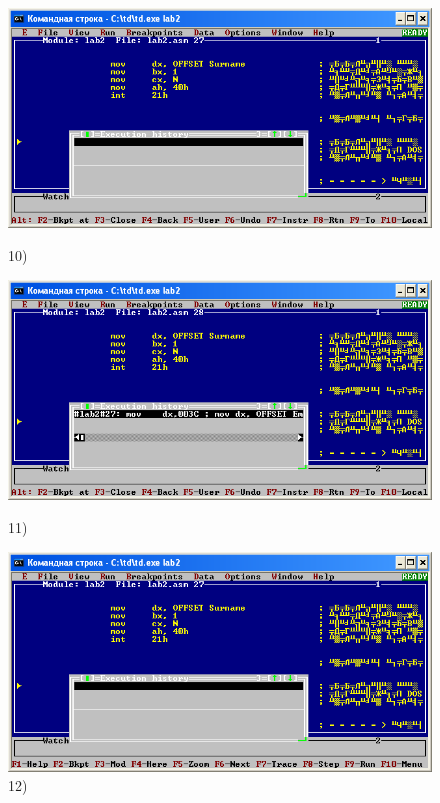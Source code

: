 \begin{figure}[!htp]
    \centering
    \begin{minipage}{0.32\textwidth}
        \centering
        \includegraphics[width=.99\linewidth]
            {../_INCLUDES/task-4-17-1/10.png}
        \caption{10) }
        \label{fig:task_4_17_2__10}
    \end{minipage}
    \begin {minipage}{0.32\textwidth}
        \centering
        \includegraphics[width=.99\linewidth]
            {../_INCLUDES/task-4-17-1/11.png}
        \caption{11) }
        \label{fig:task_4_17_2__11}
    \end{minipage}
    \begin {minipage}{0.32\textwidth}
        \centering
        \includegraphics[width=.99\linewidth]
            {../_INCLUDES/task-4-17-1/12.png}
        \caption{12) }
        \label{fig:task_4_17_2__12}
    \end{minipage}
\end{figure}
